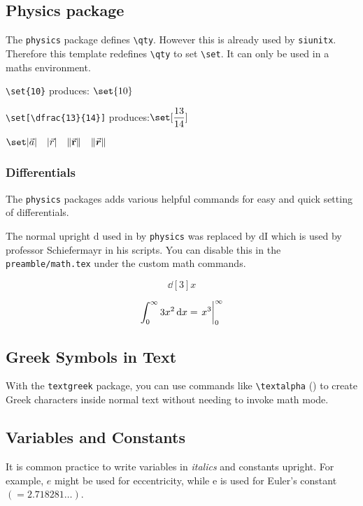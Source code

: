 \subsection{Physics package}

    The \verb|physics| package defines \verb|\qty|. However this is already used by \texttt{siunitx}. Therefore this template redefines \verb|\qty| to set \verb|\set|. It can only be used in a maths environment.

    \verb|\set{10}| produces: $\set{10}$

    \verb|\set[\dfrac{13}{14}]|     produces:$\set[\dfrac{13}{14}]$

    $\set|\vec{a}| \quad  \abs{\vec{r}} \quad \norm{\va{r}} \quad \norm{\va*{r}} $

    \subsubsection{Differentials}

    The \texttt{physics} packages adds various helpful commands for easy and quick setting of differentials.

    The normal upright d used in by \texttt{physics} was replaced by $\mathrm{d\!I}$ which is used by professor Schiefermayr in his scripts. You can disable this in the \texttt{preamble/math.tex} under the custom math commands.

     \[ \dd[3]{x} \]

     \[ \int_{0}^{\infty} 3x^2 \dd{x} = \eval{x^3}_{0}^{\infty} \]

\subsection{Greek Symbols in Text}

    With the \verb|textgreek| package, you can use commands like \verb|\textalpha| (\textalpha) to create Greek characters inside normal text without needing to invoke math mode.

\subsection{Variables and Constants}

    It is common practice to write variables in \textit{italics} and constants upright. For example, $e$ might be used for eccentricity, while $\mathrm{e}$ is used for Euler's constant $(=\num{2.718281}\dots)$.


